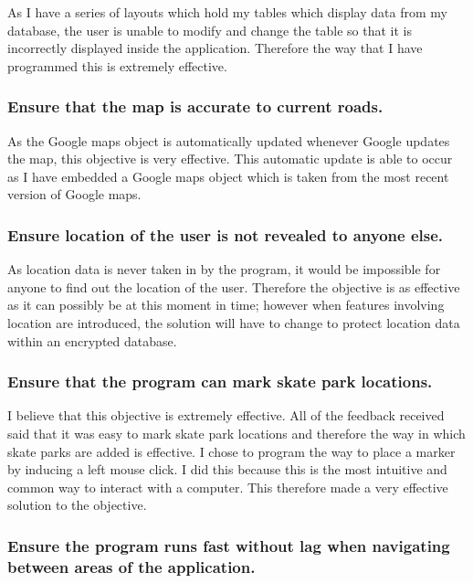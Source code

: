 As I have a series of layouts which hold my tables which display data from my database, the user is unable to modify and change the table so that it is incorrectly displayed inside the application. Therefore the way that I have programmed this is extremely effective.

	\subsubsection{Ensure that the map is accurate to current roads.}

As the Google maps object is automatically updated whenever Google updates the map, this objective is very effective. This automatic update is able to occur as I have embedded a Google maps object which is taken from the most recent version of Google maps. 

	\subsubsection{Ensure location of the user is not revealed to anyone else.}

As location data is never taken in by the program, it would be impossible for anyone to find out the location of the user. Therefore the objective is as effective as it can possibly be at this moment in time; however when features involving location are introduced, the solution will have to change to protect location data within an encrypted database. 

	\subsubsection{Ensure that the program can mark skate park locations.}

I believe that this objective is extremely effective. All of the feedback received said that it was easy to mark skate park locations and therefore the way in which skate parks are added is effective. I chose to program the way to place a marker by inducing a left mouse click. I did this because this is the most intuitive and common way to interact with a computer. This therefore made a very effective solution to the objective.

	\subsubsection{Ensure the program runs fast without lag when navigating between areas of the application.}

